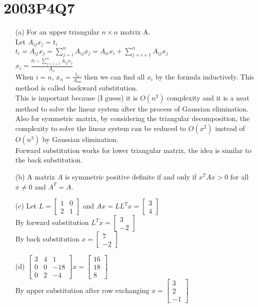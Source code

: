 \documentclass[10pt,twoside,a4paper]{article}
\begin{document}
\section*{2003P4Q7}
\begin{itemize}
\item[(a)]
For an upper triangular $n\times n$ matrix A.
\\Let $A_{ij}x_j=t_i$
\\$t_i=A_{ij}x_j=\sum_{j=i}^nA_{ij}x_j=A_{ii}x_i+\sum_{j=i+1}^nA_{ij}x_j$
\\$x_i=\frac{ti-\sum_{j=i+1}^nA_{ij}x_j}{A_{ii}}$
\\When $i=n$, $x_n=\frac{t_n}{A_{nn}} $ then we can find all $x_i$ by the formula inductively. This method is called backward substitution.
\\This is important because (I guess) it is $O(n^2)$ complexity and it is a neat method to solve the linear system after the process of Gaussian elimination. Also for symmetric matrix, by considering the triangular decomposition, the complexity to solve the linear system can be reduced to $O(x^2)$ instead of $O(n^3)$ by Gaussian elimination.
\\Forward substitution works for lower triangular matrix, the idea is similar to the back substitution.
\item[(b)]
A matrix $A$ is symmetric positive definite if and only if $x^TAx>0$ for all $x \neq 0$ and $A^T=A$.
\item[(c)]
Let $L=
\begin{bmatrix}
1&0\\
2&1
\end{bmatrix}$ and $Ax=LL^Tx=\begin{bmatrix}
3\\4
\end{bmatrix}$
\\By forward substitution $L^Tx=\begin{bmatrix}
3\\-2
\end{bmatrix}$
\\By back substitution $x=\begin{bmatrix}
7\\-2
\end{bmatrix}$
\item[(d)]
$\begin{bmatrix}
3&4&1\\
0&0&-18\\
0&2&-4
\end{bmatrix}x=\begin{bmatrix}
16\\18\\8
\end{bmatrix}$
\\By upper substitution after row exchanging $x=\begin{bmatrix}
3\\2\\-1
\end{bmatrix}$
\end{itemize}
\end{document}
